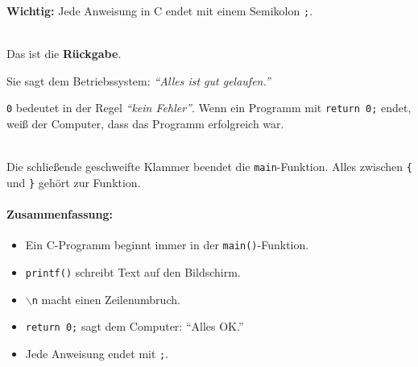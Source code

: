 \begin{description}
        \textbf{Wichtig:} Jede Anweisung in C endet mit einem Semikolon \texttt{;}.

    \item[\texttt{return 0;}]\hfill\\
        Das ist die \textbf{Rückgabe}.

        Sie sagt dem Betriebssystem: \textit{``Alles ist gut gelaufen.''}

        \texttt{0} bedeutet in der Regel \textit{``kein Fehler''}.
        Wenn ein Programm mit \texttt{return 0;} endet, weiß der Computer,
        dass das Programm erfolgreich war.

    \item[\texttt{\}} ]\hfill\\
        Die schließende geschweifte Klammer beendet die \texttt{main}-Funktion.
        Alles zwischen \texttt{\{} und \texttt{\}} gehört zur Funktion.
\end{description}

\paragraph{Zusammenfassung:}

\begin{itemize}
    \item Ein C-Programm beginnt immer in der \texttt{main()}-Funktion.
    \item \texttt{printf()} schreibt Text auf den Bildschirm.
    \item \texttt{$\backslash$n} macht einen Zeilenumbruch.
    \item \texttt{return 0;} sagt dem Computer: ``Alles OK.''
    \item Jede Anweisung endet mit \texttt{;}.
\end{itemize}

